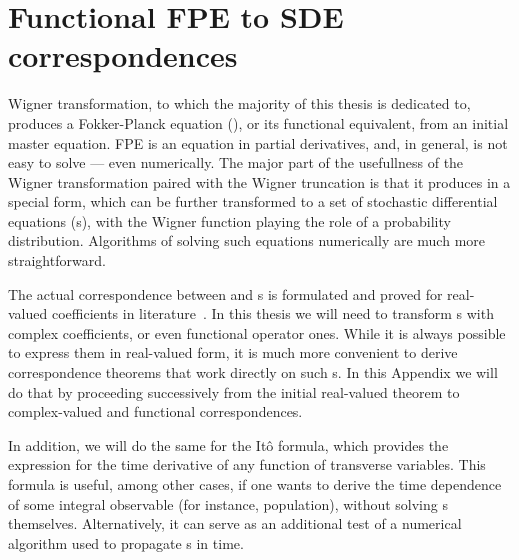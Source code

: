 \chapter{Functional FPE to SDE correspondences}
\label{cha:appendix:fpe-sde}

Wigner transformation, to which the majority of this thesis is dedicated to, produces a Fokker-Planck equation (), or its functional equivalent, from an initial master equation.
FPE is an equation in partial derivatives, and, in general, is not easy to solve --- even numerically.
The major part of the usefullness of the Wigner transformation paired with the Wigner truncation is that it produces  in a special form, which can be further transformed to a set of stochastic differential equations (s), with the Wigner function playing the role of a probability distribution.
Algorithms of solving such equations numerically are much more straightforward.

The actual correspondence between  and s is formulated and proved for real-valued coefficients in literature~\cite{Risken1996}.
In this thesis we will need to transform s with complex coefficients, or even functional operator ones.
While it is always possible to express them in real-valued form, it is much more convenient to derive correspondence theorems that work directly on such s.
In this Appendix we will do that by proceeding successively from the initial real-valued theorem to complex-valued and functional correspondences.

In addition, we will do the same for the It\^{o} formula, which provides the expression for the time derivative of any function of transverse variables.
This formula is useful, among other cases, if one wants to derive the time dependence of some integral observable (for instance, population), without solving s themselves.
Alternatively, it can serve as an additional test of a numerical algorithm used to propagate s in time.



